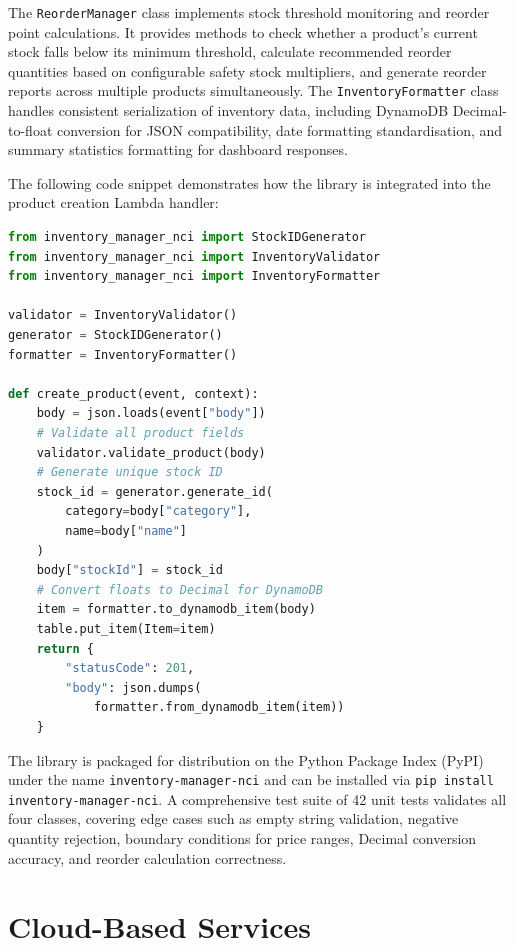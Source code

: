 \documentclass[conference]{IEEEtran}
\begin{document}
The \texttt{ReorderManager} class implements stock threshold monitoring and reorder point calculations. It provides methods to check whether a product's current stock falls below its minimum threshold, calculate recommended reorder quantities based on configurable safety stock multipliers, and generate reorder reports across multiple products simultaneously. The \texttt{InventoryFormatter} class handles consistent serialization of inventory data, including DynamoDB Decimal-to-float conversion for JSON compatibility, date formatting standardisation, and summary statistics formatting for dashboard responses.

The following code snippet demonstrates how the library is integrated into the product creation Lambda handler:

\begin{lstlisting}[language=Python, caption={Library integration in product creation handler}]
from inventory_manager_nci import StockIDGenerator
from inventory_manager_nci import InventoryValidator
from inventory_manager_nci import InventoryFormatter

validator = InventoryValidator()
generator = StockIDGenerator()
formatter = InventoryFormatter()

def create_product(event, context):
    body = json.loads(event["body"])
    # Validate all product fields
    validator.validate_product(body)
    # Generate unique stock ID
    stock_id = generator.generate_id(
        category=body["category"],
        name=body["name"]
    )
    body["stockId"] = stock_id
    # Convert floats to Decimal for DynamoDB
    item = formatter.to_dynamodb_item(body)
    table.put_item(Item=item)
    return {
        "statusCode": 201,
        "body": json.dumps(
            formatter.from_dynamodb_item(item))
    }
\end{lstlisting}

The library is packaged for distribution on the Python Package Index (PyPI) under the name \texttt{inventory-manager-nci} and can be installed via \texttt{pip install inventory-manager-nci}. A comprehensive test suite of 42 unit tests validates all four classes, covering edge cases such as empty string validation, negative quantity rejection, boundary conditions for price ranges, Decimal conversion accuracy, and reorder calculation correctness.

\section{Cloud-Based Services}
\end{document}

